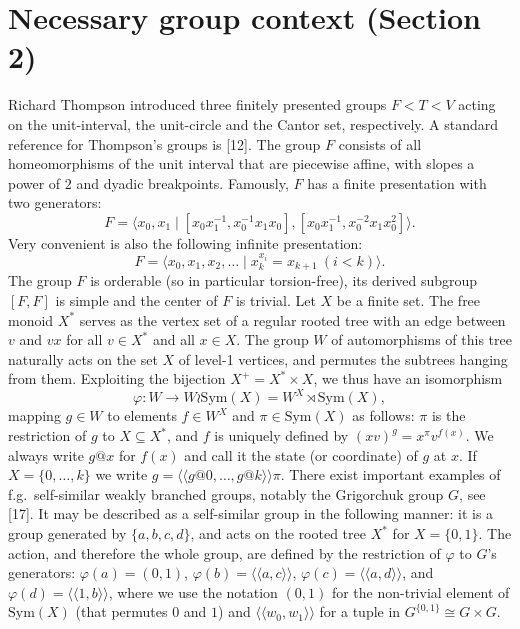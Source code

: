 \documentclass[10pt,a4paper]{article}
\begin{document}
\section*{Necessary group context (Section 2)}
Richard Thompson introduced three finitely presented groups $F<T<V$ acting on the unit-interval, the unit-circle and the Cantor set, respectively. A standard reference for Thompson's groups is [12]. The group $F$ consists of all homeomorphisms of the unit interval that are piecewise affine, with slopes a power of $2$ and dyadic breakpoints. Famously, $F$ has a finite presentation with two generators:
\[
F=\langle x_0,x_1\mid[x_0x_1^{-1},x_0^{-1}x_1x_0],[x_0x_1^{-1},x_0^{-2}x_1x_0^2]\rangle .
\]
Very convenient is also the following infinite presentation:
\[
F=\langle x_0,x_1,x_2,\ldots\mid x_k^{x_i}=x_{k+1}\ (i<k)\rangle .
\]
The group $F$ is orderable (so in particular torsion-free), its derived subgroup $[F,F]$ is simple and the center of $F$ is trivial.
Let $X$ be a finite set. The free monoid $X^*$ serves as the vertex set of a regular rooted tree with an edge between $v$ and $vx$ for all $v\in X^*$ and all $x\in X$. The group $W$ of automorphisms of this tree naturally acts on the set $X$ of level-1 vertices, and permutes the subtrees hanging from them. Exploiting the bijection $X^+=X^*\times X$, we thus have an isomorphism
\[
\varphi:W\to W\wr\mathrm{Sym}(X)=W^X\rtimes\mathrm{Sym}(X),
\]
mapping $g\in W$ to elements $f\in W^X$ and $\pi\in\mathrm{Sym}(X)$ as follows: $\pi$ is the restriction of $g$ to $X\subseteq X^*$, and $f$ is uniquely defined by $(xv)^g=x^\pi v^{f(x)}$. We always write $g@x$ for $f(x)$ and call it the state (or coordinate) of $g$ at $x$. If $X=\{0,\ldots,k\}$ we write $g=\langle\!\langle g@0,\ldots,g@k\rangle\!\rangle\pi$.
There exist important examples of f.g.\ self-similar weakly branched groups, notably the Grigorchuk group $G$, see [17]. It may be described as a self-similar group in the following manner: it is a group generated by $\{a,b,c,d\}$, and acts on the rooted tree $X^*$ for $X=\{0,1\}$. The action, and therefore the whole group, are defined by the restriction of $\varphi$ to $G$'s generators: $\varphi(a)=(0,1)$, $\varphi(b)=\langle\!\langle a,c\rangle\!\rangle$, $\varphi(c)=\langle\!\langle a,d\rangle\!\rangle$, and $\varphi(d)=\langle\!\langle1,b\rangle\!\rangle$, where we use the notation $(0,1)$ for the non-trivial element of $\mathrm{Sym}(X)$ (that permutes $0$ and $1$) and $\langle\!\langle w_0,w_1\rangle\!\rangle$ for a tuple in $G^{\{0,1\}}\cong G\times G$.
\end{document}
